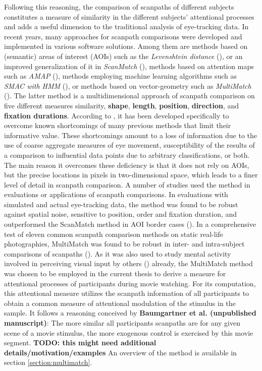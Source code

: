 \documentclass[a4paper, 12pt]{scrreprt}
\begin{document}
Following this reasoning, the comparison of scanpaths of different subjects constitutes a measure of similarity in the different subjects’ attentional processes and adds a useful dimension to the traditional analysis of eye-tracking data. \newline
In recent years, many approaches for scanpath comparisons were developed and implemented in various software solutions. Among them are methods based on (semantic) areas of interest (AOIs) such as the \textit{Levenshtein distance} (\cite{levenshtein1966binary}), or an improved generalization of it in \textit{ScanMatch} (\cite{cristino2010scanmatch}), methods based on attention maps such as \textit{AMAP} (\cite{ouerhani2004empirical}), methods employing machine learning algorithms such as \textit{SMAC with HMM} (\cite{coutrot2018scanpath}), or methods based on vector-geometry such as \textit{MultiMatch} (\cite{jarodzka2010vector}). The latter method is a multidimensional approach of scanpath comparison on five different measures similarity, \textbf{shape}, \textbf{length}, \textbf{position}, \textbf{direction}, and \textbf{fixation durations}. According to \textcite{jarodzka2010vector}, it has been developed specifically to overcome known shortcomings of many previous methods that limit their informative value. These shortcomings amount to a loss of information due to the use of coarse aggregate measures of eye movement, susceptibility of the results of a comparison to influential data points due to arbitrary classifications, or both. The main reason it overcomes these deficiency is that it does not rely on AOIs, but the precise locations in pixels in two-dimensional space, which leads to a finer level of detail in scanpath comparison. \newline A number of studies used the method in evaluations or applications of scanpath comparisons. In evaluations with simulated and actual eye-tracking data, the method was found to be robust against spatial noise, sensitive to position, order and fixation duration, and outperformed the ScanMatch method in AOI border cases (\cite{dewhurst2012depends}). In a comprehensive test of eleven common scanpath comparison methods on static real-life photographies, MultiMatch was found to be robust in inter- and intra-subject comparisons of scanpaths (\cite{anderson2015comparison}). As it was also used to study mental activity involved in perceiving visual input by others (\cite{french2017evaluation}) already, the MultiMatch method was chosen to be employed in the current thesis to derive a measure for attentional processes of participants during movie watching. \newline
For its computation, this attentional measure utilizes the scanpath information of all participants to obtain a common measure of attentional modulation of the stimulus in the sample. It follows a reasoning conceived by \textbf{Baumgartner et al. (unpublished manuscript)}: The more similar all participants scanpaths are for any given scene of a movie stimulus, the more exogenous control is exercised by this movie segment. \textbf{TODO: this might need additional details/motivation/examples} \newline
 An overview of the method is available in section \ref{section:multimatch}.
\end{document}
